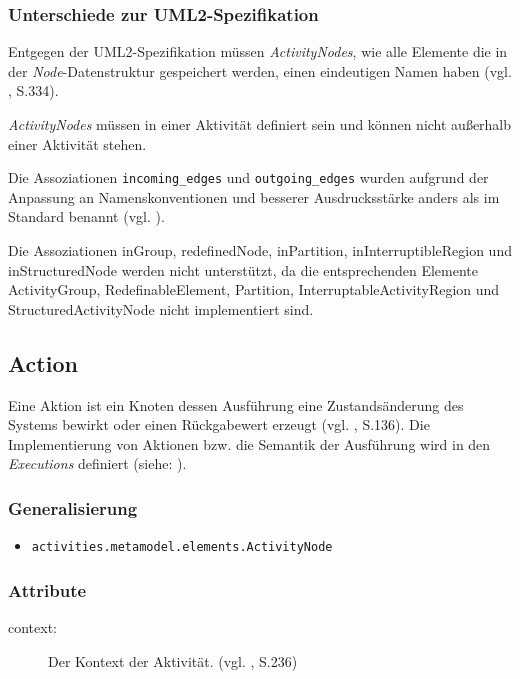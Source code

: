 \subsubsection{Unterschiede zur UML2-Spezifikation}
Entgegen der UML2-Spezifikation müssen \emph{ActivityNodes}, wie alle Elemente die in der \emph{Node}-Datenstruktur gespeichert werden, einen eindeutigen Namen haben (vgl. \citep{OMG2009}, S.334).

\emph{ActivityNodes} müssen in einer Aktivität definiert sein und können nicht außerhalb einer Aktivität stehen.

Die Assoziationen \texttt{incoming\_edges} und \texttt{outgoing\_edges} wurden aufgrund der Anpassung an Namenskonventionen und besserer Ausdrucksstärke anders als im Standard benannt (vgl. \citep{PEP20}).

Die Assoziationen inGroup, redefinedNode, inPartition, inInterruptibleRegion und inStructuredNode werden nicht unterstützt, da die entsprechenden Elemente ActivityGroup, RedefinableElement, Partition, InterruptableActivityRegion und StructuredActivityNode nicht implementiert sind.


\subsection{Action}
Eine Aktion ist ein Knoten dessen Ausführung eine Zustandsänderung des Systems bewirkt oder einen Rückgabewert erzeugt (vgl. \citep{RumbaughJacobsonBooch2005}, S.136). Die Implementierung von Aktionen bzw. die Semantik der Ausführung wird in den \emph{Executions} definiert (siehe: ).

\subsubsection{Generalisierung}
\begin{itemize}
\item \texttt{activities.metamodel.elements.ActivityNode}
\end{itemize}

\subsubsection{Attribute}
\begin{description}
\item[context:] Der Kontext der Aktivität. (vgl. \citep{OMG2009}, S.236)
\end{description}

